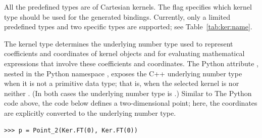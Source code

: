 All the predefined types are of Cartesian kernels. The \cmake{} flag  specifies which kernel type should be used for the generated bindings.  Currently, only a limited predefined types and two specific types are supported; see Table~\ref{tab:ker:name}.

\begin{table}[!htp]
  \caption{Kernel name options.  stands for
    .}
 \centering{}
 \label{tab:ker:name}
\end{table}

The kernel type determines the underlying number type used to represent coefficients and coordinates of kernel objects and for evaluating mathematical expressions that involve these coefficients and coordinates. The Python attribute , nested in the Python namespace , exposes the C++ underlying number type when it is not a primitive data type; that is, when the selected kernel is nor  neither . (In both cases the underlying number type is .) Similar to The Python code above, the code below defines a
two-dimensional point; here, the coordinates are explicitly converted to the underlying number type.
\begin{lstlisting}[style=pythonStyle]
>>> p = Point_2(Ker.FT(0), Ker.FT(0))
\end{lstlisting}

